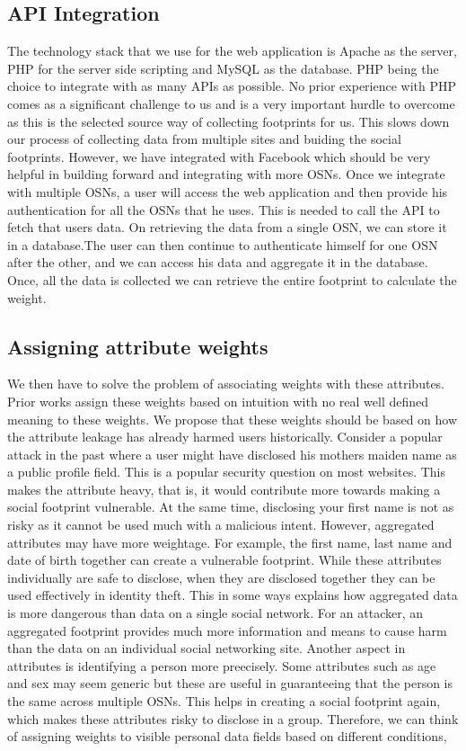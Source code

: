 \documentclass[12pt,conference]{IEEEtran}
\begin{document}
\subsection{API Integration}
The technology stack that we use for the web application is Apache as the server, PHP for the server side scripting and MySQL as the database. PHP being the choice to integrate with as many APIs as possible. No prior experience with PHP comes as a significant challenge to us and is a very important hurdle to overcome as this is the selected source way of collecting footprints for us. This slows down our process of collecting data from multiple sites and buiding the social footprints. However, we have integrated with Facebook which should be very helpful in building forward and integrating with more OSNs. Once we integrate with multiple OSNs, a user will access the web application and then provide his authentication for all the OSNs that he uses. This is needed to call the API to fetch that users data. On retrieving the data from a single OSN, we can store it in a database.The user can then continue to authenticate himself for one OSN after the other, and we can access his data and aggregate it in the database. Once, all the data is collected we can retrieve the entire footprint to calculate the weight.
\subsection{Assigning attribute weights}
We then have to solve the problem of associating weights with these attributes. Prior works assign these weights based on intuition with no real well defined meaning to these weights. We propose that these weights should be based on how the attribute leakage has already harmed users historically. Consider a popular attack in the past where a user might have disclosed his mothers maiden name as a public profile field. This is a popular security question on most websites. This makes the attribute heavy, that is, it would contribute more towards making a social footprint vulnerable. At the same time, disclosing your first name is not as risky as it cannot be used much with a malicious intent. However, aggregated attributes may have more weightage. For example, the first name, last name and date of birth together can create a vulnerable footprint. While these attributes individually are safe to disclose, when they are disclosed together they can be used effectively in identity theft. This in some ways explains how aggregated data is more dangerous than data on a single social network. For an attacker, an aggregated footprint provides much more information and means to cause harm than the data on an individual social networking site. Another aspect in attributes is identifying a person more preecisely. Some attributes such as age and sex may seem generic but these are useful in guaranteeing that the person is the same across multiple OSNs. This helps in creating a social footprint again, which makes these attributes risky to disclose in a group. Therefore, we can think of assigning weights to visible personal data fields based on different conditions, 
\end{document}
